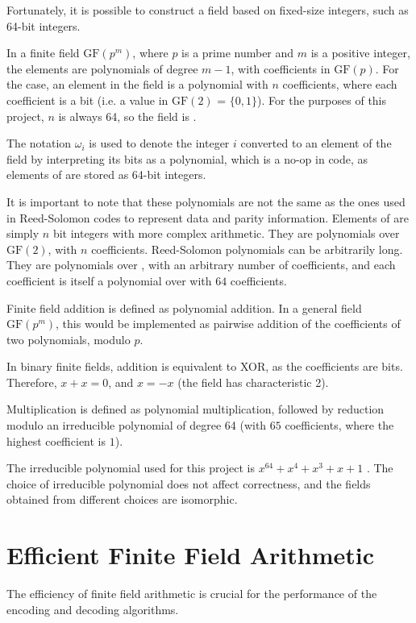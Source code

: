 Fortunately, it is possible to construct a field based on fixed-size integers, such as 64-bit integers.

In a finite field $\text{GF}(p^m)$, where $p$ is a prime number and $m$ is a positive integer, the elements are polynomials of degree $m - 1$, with coefficients in $\text{GF}(p)$.
For the  case, an element in the field is a polynomial with $n$ coefficients, where each coefficient is a bit (i.e. a value in $\text{GF}(2)$ = $\{0, 1\}$).
For the purposes of this project, $n$ is always 64, so the field is .

The notation $\omega_i$ is used to denote the integer $i$ converted to an element of the field  by interpreting its bits as a polynomial, which is a no-op in code, as elements of  are stored as 64-bit integers.

It is important to note that these polynomials are not the same as the ones used in Reed-Solomon codes to represent data and parity information.
Elements of  are simply $n$ bit integers with more complex arithmetic. They are polynomials over $\text{GF}(2)$, with $n$ coefficients.
Reed-Solomon polynomials can be arbitrarily long. They are polynomials over , with an arbitrary number of coefficients, and each coefficient is itself a polynomial over  with $64$ coefficients.

Finite field addition is defined as polynomial addition.
In a general field $\text{GF}(p^m)$, this would be implemented as pairwise addition of the coefficients of two polynomials, modulo $p$.

In binary finite fields, addition is equivalent to XOR, as the coefficients are bits. Therefore, $x + x = 0$, and $x = -x$ (the field has characteristic 2).

Multiplication is defined as polynomial multiplication, followed by reduction modulo an irreducible polynomial of degree 64 (with $65$ coefficients, where the highest coefficient is $1$).

The irreducible polynomial used for this project is $x^{64} + x^4 + x^3 + x + 1$ \cite{low-weight-polynomials}.
The choice of irreducible polynomial does not affect correctness, and the fields obtained from different choices are isomorphic.

\section{Efficient Finite Field Arithmetic}

The efficiency of finite field arithmetic is crucial for the performance of the encoding and decoding algorithms.

